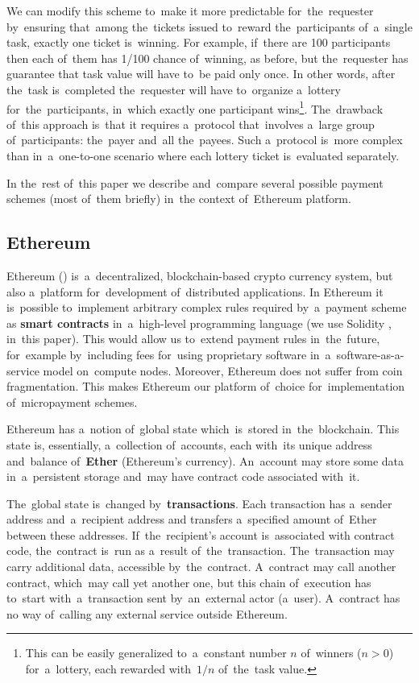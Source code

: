 \documentclass[a4paper]{article}
\begin{document}
    We can modify this scheme to~make it more predictable for~the~requester by~ensuring that~among the~tickets issued
    to~reward the~participants of~a~single task, exactly one ticket is~winning. For example, if~there are 100
    participants then each of~them has 1/100 chance of~winning, as before, but the~requester has guarantee that
    task value will have to~be paid only once. In other words, after the~task is~completed the~requester will have
    to~organize a~lottery for~the~participants, in~which exactly one participant wins\footnote{This can be easily
    generalized to~a~constant number $n$ of~winners ($n > 0$) for~a~lottery, each rewarded with~$1/n$ of~the~task
    value.}.
    The~drawback of~this approach is~that it requires a~protocol that~involves a~large group of~participants:
    the~payer and~all the~payees.
    Such a~protocol is~more complex than in~a~one-to-one scenario where each lottery ticket is~evaluated separately.

    In the~rest of~this paper we describe and~compare several possible payment schemes (most of~them briefly) in~the
    context of~Ethereum platform.

\subsection{Ethereum}
    Ethereum (\cite{ETHEREUM}) is~a~decentralized, blockchain-based crypto currency system, but also a~platform
    for~development of~distributed applications. In Ethereum it is~possible to~implement arbitrary complex rules
    required by~a~payment scheme as \textbf{smart contracts} in~a~high-level programming language (we use Solidity
    \cite{SOLIDITY}, in~this paper).
    This would allow us to~extend payment rules in~the~future, for~example by~including fees for~using
    proprietary software in~a~software-as-a-service model on~compute nodes. Moreover, Ethereum does not suffer from
    coin fragmentation. This makes Ethereum our platform of~choice for~implementation of~micropayment schemes.

    Ethereum has a~notion of~global state which~is~stored in~the~blockchain. This state is, essentially, a~collection
    of~accounts, each with~its unique address and~balance of~\textbf{Ether} (Ethereum's currency). An~account may store some
    data in~a~persistent storage and~may have contract code associated with~it.

    The~global state is~changed by~\textbf{transactions}. Each transaction has a~sender address and~a~recipient address and
    transfers a~specified amount of~Ether between these addresses. If~the~recipient's account is~associated with
    contract code, the~contract is~run as a~result of~the~transaction. The~transaction may carry additional data,
    accessible by~the~contract. A~contract may call another contract, which~may call yet another one, but this chain
    of~execution has to~start with~a~transaction sent by~an~external actor (a~user). A~contract has no way of~calling
    any external service outside Ethereum.
\end{document}
